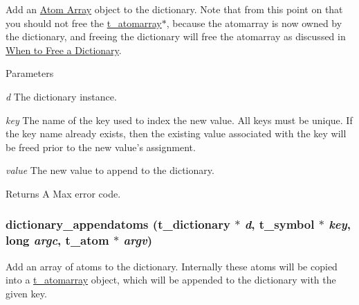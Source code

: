 Add an \hyperlink{group__atomarray}{Atom Array} object to the dictionary. Note that from this point on that you should not free the \hyperlink{structt__atomarray}{t\_\-atomarray}$\ast$, because the atomarray is now owned by the dictionary, and freeing the dictionary will free the atomarray as discussed in \hyperlink{group__dictionary_when_to_free_a_dictionary}{When to Free a Dictionary}.


\begin{DoxyParams}{Parameters}
\item[{\em d}]The dictionary instance. \item[{\em key}]The name of the key used to index the new value. All keys must be unique. If the key name already exists, then the existing value associated with the key will be freed prior to the new value's assignment. \item[{\em value}]The new value to append to the dictionary. \end{DoxyParams}
\begin{DoxyReturn}{Returns}
A Max error code. 
\end{DoxyReturn}
\hypertarget{group__dictionary_ga863a83cc13afbd42a09e8505bee8eea5}{
\subsubsection[{dictionary\_\-appendatoms}]{ dictionary\_\-appendatoms ({\bf t\_\-dictionary} $\ast$ {\em d}, \/  {\bf t\_\-symbol} $\ast$ {\em key}, \/  long {\em argc}, \/  {\bf t\_\-atom} $\ast$ {\em argv})}}
\label{group__dictionary_ga863a83cc13afbd42a09e8505bee8eea5}


Add an array of atoms to the dictionary. Internally these atoms will be copied into a \hyperlink{structt__atomarray}{t\_\-atomarray} object, which will be appended to the dictionary with the given key.


